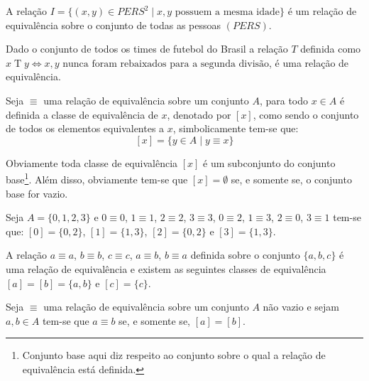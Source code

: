 \begin{example}
	A relação $I =  \{(x, y) \in PERS^2 \mid x, y \text{ possuem a mesma idade}\}$ é um relação de equivalência sobre o conjunto de todas as pessoas $(PERS)$.
\end{example}

\begin{example}
	Dado o conjunto de todos os times de futebol do Brasil a relação $T$ definida como $x \mathrel{T} y \Longleftrightarrow x, y \text{ nunca foram rebaixados para a segunda divisão}$, é uma relação de equivalência.
\end{example}


\begin{definition}
	Seja $\equiv$ uma relação de equivalência sobre um conjunto $A$, para todo $x \in A$ é definida a classe de equivalência de $x$, denotado por $[x]$, como sendo o conjunto de todos os elementos equivalentes a $x$, simbolicamente tem-se que:
	$$[x] = \{y \in A \mid y \equiv x\}$$
\end{definition}

Obviamente toda classe de equivalência $[x]$ é um subconjunto do conjunto base\footnote{Conjunto base aqui diz respeito ao conjunto sobre o qual a relação de equivalência está definida.}. Além disso,  obviamente tem-se que $[x] = \emptyset$ se, e somente se, o conjunto base for vazio. 

\begin{example}\label{exe:ClasseEquivalencia1}
	Seja $A = \{0, 1, 2, 3\}$ e $0 \equiv 0$, $1 \equiv 1$, $2 \equiv 2$, $3 \equiv 3$, $0 \equiv 2$, $1 \equiv 3$, $2 \equiv 0$, $3 \equiv 1$ tem-se que: $[0] = \{0, 2\}$, $[1] = \{1, 3\}$, $[2] = \{0, 2\}$ e $[3] = \{1, 3\}$.
\end{example}

\begin{example}
	A relação $a \equiv a$, $b \equiv b$, $c \equiv c$, $a \equiv b$, $b \equiv a$ definida sobre o conjunto $\{a, b, c\}$ é uma relação de equivalência e existem as seguintes classes de equivalência $[a] = [b] = \{a, b\}$ e $[c] =\{c\}$.
\end{example}

\begin{theorem}\label{teo:EquivalenciaPropriedade1}
	Seja $\equiv$ uma relação de equivalência sobre um conjunto $A$ não vazio e sejam $a, b \in A$ tem-se que $a \equiv b$ se, e somente se, $[a] = [b]$.
\end{theorem}

